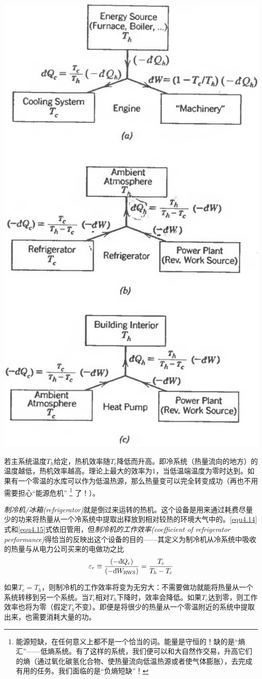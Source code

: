 {
	\centering
	\includegraphics[width=.5\textwidth]{Pictures/fig4.6.png}
	\label{fig4.6}
}

若主系统温度$T_h$给定，热机效率随$T_c$降低而升高。即冷系统（热量流向的地方）的温度越低，热机效率越高。理论上最大的效率为$1$，当低温端温度为零时达到。如果有一个零温的水库可以作为低温热源，那么热量变可以完全转变成功（再也不用需要担心“能源危机”%
\footnote{能源短缺，在任何意义上都不是一个恰当的词。能量是守恒的！缺的是“熵汇”——低熵系统。有了这样的系统，我们便可以和大自然作交易，升高它们的熵（通过氧化碳氢化合物、使热量流向低温热源或者使气体膨胀），去完成有用的任务。我们面临的是“负熵短缺”！}%
%
了！）。

{\it 制冷机/冰箱(refrigerator)}就是倒过来运转的热机。这个设备是用来通过耗费尽量少的功来将热量从一个冷系统中提取出释放到相对较热的环境大气中的。\eqref{equ4.14}式和\eqref{equ4.15}式依旧管用，但{\it 制冷机的工作效率(coefficient of refrigerator performance)}得恰当的反映出这个设备的目的——其定义为制冷机从冷系统中吸收的热量与从电力公司买来的电做功之比
\begin{equation}
\varepsilon_r \equiv \frac{(-\mathrm d\hspace*{-0.1em}\bar{}\hspace*{0.08em} Q_c)}{(-\mathrm d\hspace*{-0.1em}\bar{}\hspace*{0.08em} W_\text{\text{RWS}})} = \frac{T_c}{T_h-T_c}
\end{equation}

如果$T_c=T_h$，则制冷机的工作效率将变为无穷大：不需要做功就能将热量从一个系统转移到另一个系统。当$T_c$相对$T_h$下降时，效率会降低。如果$T_c$达到零，则工作效率也将为零（假定$T_h$不变）。即便是将很少的热量从一个零温附近的系统中提取出来，也需要消耗大量的功。

